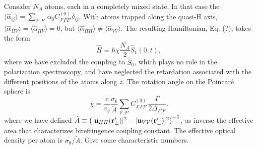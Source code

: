 \documentclass[preprint,aps,pra,onecolumn]{revtex4-1} %
\begin{document}
Consider $N_A$ atoms, each in a completely mixed state.  In that case the $\langle \hat{\alpha}_{ij} \rangle = \sum_{F,F'} \alpha_0 C_{J'FF'}^{(0)} \delta_{ij}$.  With atoms trapped along the quasi-H axis,  $\langle \hat{\alpha}_{HV} \rangle = \langle \hat{\alpha}_{HV} \rangle =0$, but  $\langle \hat{\alpha}_{HH} \rangle \neq  \langle \hat{\alpha}_{VV} \rangle$.  The resulting Hamiltonian, Eq. (?), takes the form
\begin{equation}
\hat{H} = \hbar \chi \frac{N_A}{2} \hat{S}_1(0,t),
\end{equation}
where we have excluded the coupling to $\hat{S}_0$, which plays no role in the polarization spectroscopy, and have neglected the retardation associated with the different positions of the atoms along $z$.  The rotation angle on the Poincar\'{e} sphere is
\begin{equation}
\chi = \frac{c}{v_g} \frac{\sigma_0}{\tilde{A}}  \sum_{F,F'}  C_{J'FF'}^{(0)} \frac{\Gamma}{2\Delta_{F'F}} .
\end{equation}
where we have defined $\tilde{A} \equiv \left(|\mathbf{u}_{HH}(\mathbf{r}'_\perp)|^2 - |\mathbf{u}_{VV}(\mathbf{r}'_\perp)| ^2 \right)^{-1}$, as inverse the effective area that characterizes birefringence coupling constant. The effective optical density per atom is $\sigma_0/\tilde{A}$.  {\color{red}  Give some characteristic numbers.}  
\end{document}
